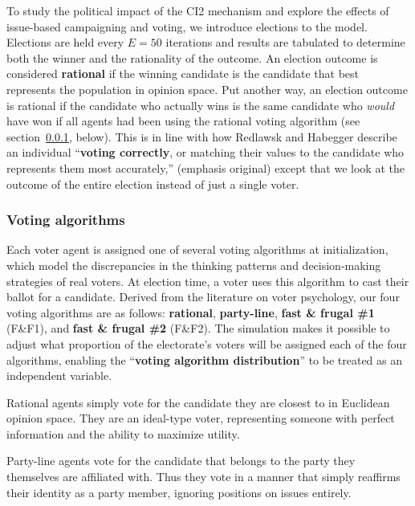 To study the political impact of the CI2 mechanism and explore the effects of
issue-based campaigning and voting, we introduce elections to the model.
Elections are held every $E=50$ iterations and results are tabulated to
determine both the winner and the rationality of the outcome. An election
outcome is considered \textbf{rational} if the winning candidate is the
candidate that best represents the population in opinion space. Put another
way, an election outcome is rational if the candidate who actually wins is the
same candidate who \textit{would} have won if all agents had been using the
rational voting algorithm (see section~\ref{votingAlgorithms}, below). This is
in line with how Redlawsk and Habegger describe an individual ``\textbf{voting
correctly}, or matching their values to the candidate who represents them most
accurately,''\cite[p.8]{redlawsk_citizens_2020} (emphasis original) except that
we look at the outcome of the entire election instead of just a single voter.

\subsubsection{Voting algorithms}
\label{votingAlgorithms}


Each voter agent is assigned one of several voting algorithms at
initialization, which model the discrepancies in the thinking patterns and
decision-making strategies of real voters. At election time, a voter uses this
algorithm to cast their ballot for a candidate. Derived from the literature on
voter psychology\cite[ch.2]{redlawsk_citizens_2020}, our four voting algorithms
are as follows: \textbf{rational}, \textbf{party-line}, \textbf{fast \& frugal
\#1} (F\&F1), and \textbf{fast \& frugal \#2} (F\&F2). The simulation makes it
possible to adjust what proportion of the electorate's voters will be assigned
each of the four algorithms, enabling the ``\textbf{voting algorithm
distribution}'' to be treated as an independent variable.

Rational agents simply vote for the candidate they are closest to in Euclidean
opinion space. They are an ideal-type voter, representing someone with perfect
information and the ability to maximize utility.

Party-line agents vote for the candidate that belongs to the party they
themselves are affiliated with. Thus they vote in a manner that simply
reaffirms their identity as a party member, ignoring positions on issues
entirely.

